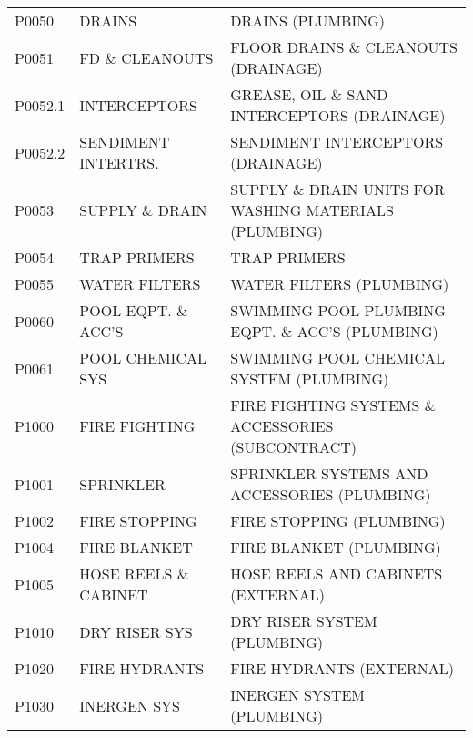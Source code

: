 \begin{longtable}[l]{l%
                  l|%
                  l|}
\rowcolor{thetableheadbgcolor!0.25!white} P0050       & DRAINS   & DRAINS (PLUMBING)   \\
\rowcolor{thetableheadbgcolor!0.25!white} P0051       & FD \& CLEANOUTS   & FLOOR DRAINS \& CLEANOUTS (DRAINAGE)   \\
\rowcolor{thetableheadbgcolor!0.25!white} P0052.1     & INTERCEPTORS   & GREASE, OIL \& SAND INTERCEPTORS (DRAINAGE)   \\
\rowcolor{thetableheadbgcolor!0.25!white} P0052.2     & SENDIMENT INTERTRS.   & SENDIMENT INTERCEPTORS (DRAINAGE)   \\
\rowcolor{thetableheadbgcolor!0.25!white} P0053       & SUPPLY \& DRAIN   & SUPPLY \& DRAIN UNITS FOR WASHING MATERIALS (PLUMBING)   \\
\rowcolor{thetableheadbgcolor!0.25!white} P0054       & TRAP PRIMERS   & TRAP PRIMERS   \\
\rowcolor{thetableheadbgcolor!0.25!white} P0055       & WATER FILTERS   & WATER FILTERS (PLUMBING)   \\
\rowcolor{thetableheadbgcolor!0.25!white} P0060       & POOL EQPT. \& ACC'S   & SWIMMING POOL PLUMBING EQPT. \& ACC'S (PLUMBING)   \\
\rowcolor{thetableheadbgcolor!0.25!white} P0061       & POOL CHEMICAL SYS   & SWIMMING POOL CHEMICAL SYSTEM (PLUMBING)   \\
\rowcolor{thetableheadbgcolor!0.25!white} P1000       & FIRE FIGHTING   & FIRE FIGHTING SYSTEMS \& ACCESSORIES (SUBCONTRACT)   \\
\rowcolor{thetableheadbgcolor!0.25!white} P1001       & SPRINKLER   & SPRINKLER SYSTEMS AND ACCESSORIES (PLUMBING)   \\
\rowcolor{thetableheadbgcolor!0.25!white} P1002       & FIRE STOPPING   & FIRE STOPPING (PLUMBING)   \\
\rowcolor{thetableheadbgcolor!0.25!white} P1004       & FIRE BLANKET   & FIRE BLANKET (PLUMBING)   \\
\rowcolor{thetableheadbgcolor!0.25!white} P1005       & HOSE REELS \& CABINET   & HOSE REELS AND CABINETS (EXTERNAL)   \\
\rowcolor{thetableheadbgcolor!0.25!white} P1010       & DRY RISER SYS   & DRY RISER SYSTEM (PLUMBING)   \\
\rowcolor{thetableheadbgcolor!0.25!white} P1020       & FIRE HYDRANTS   & FIRE HYDRANTS (EXTERNAL)   \\
\rowcolor{thetableheadbgcolor!0.25!white} P1030       & INERGEN SYS   & INERGEN SYSTEM (PLUMBING)   \\

\end{longtable}
